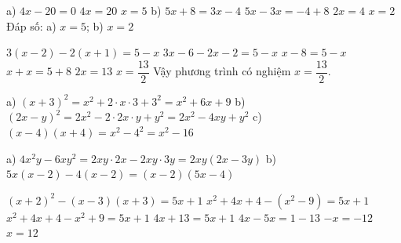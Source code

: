 \begin{problem}[8DS-PT1-001]
a) $4x - 20 = 0$
$4x = 20$
$x = 5$
b) $5x + 8 = 3x - 4$
$5x - 3x = -4 + 8$
$2x = 4$
$x = 2$
Đáp số: a) $x = 5$; b) $x = 2$
\end{problem}

\begin{problem}[8DS-PT1-003]
$3(x - 2) - 2(x + 1) = 5 - x$
$3x - 6 - 2x - 2 = 5 - x$
$x - 8 = 5 - x$
$x + x = 5 + 8$
$2x = 13$
$x = \dfrac{13}{2}$
Vậy phương trình có nghiệm $x = \dfrac{13}{2}$.
\end{problem}

\begin{problem}[8DS-HDT-001]
a) $(x + 3)^2 = x^2 + 2 \cdot x \cdot 3 + 3^2 = x^2 + 6x + 9$
b) $(2x - y)^2 = 2x^2 - 2 \cdot 2x \cdot y + y^2 = 2x^2 - 4xy + y^2$
c) $(x - 4)(x + 4) = x^2 - 4^2 = x^2 - 16$
\end{problem}

\begin{problem}[8DS-PTNT-001]
a) $4x^2y - 6xy^2 = 2xy \cdot 2x - 2xy \cdot 3y = 2xy(2x - 3y)$
b) $5x(x - 2) - 4(x - 2) = (x - 2)(5x - 4)$
\end{problem}

\begin{problem}[8DS-PT1-005]
$(x + 2)^2 - (x - 3)(x + 3) = 5x + 1$
$x^2 + 4x + 4 - (x^2 - 9) = 5x + 1$
$x^2 + 4x + 4 - x^2 + 9 = 5x + 1$
$4x + 13 = 5x + 1$
$4x - 5x = 1 - 13$
$-x = -12$
$x = 12$
\end{problem}
